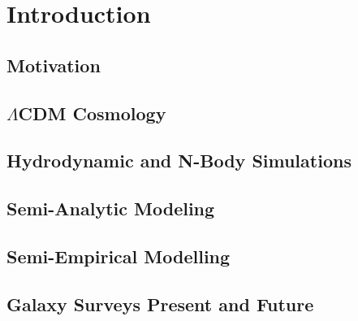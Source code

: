 
\chapter{Introduction} %
\label{Chapter:Intro}

\section{Motivation}
\label{sec:Motivation}

\section{$\Lambda$CDM Cosmology}
\label{sec:LCDM}

\section{Hydrodynamic and N-Body Simulations}
\label{sec:Hydro}

\section{Semi-Analytic Modeling}
\label{sec:SAM}

\section{Semi-Empirical Modelling}
\label{sec:SEM}

\section{Galaxy Surveys Present and Future}
\label{sec:Surveys}


